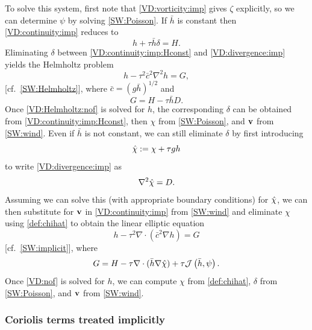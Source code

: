 \documentclass[12pt]{article}
\newcommand{\href}{\bar{h}}
\newcommand{\cbar}{\bar{c}}
\newcommand{\del}{\nabla}
\newcommand{\laplacian}[1]{\del^2#1}
\newcommand{\jacobian}[2]{\mathcal{J}\left(#1,#2\right)}
\begin{document}
To solve this system, first note that \eqref{VD:vorticity:imp} gives $\zeta$
explicitly, so we can determine $\psi$ by solving \eqref{SW:Poisson}. 
If $\href$ is constant then \eqref{VD:continuity:imp} reduces to
\begin{equation}
  h + \tau \href\delta = H .
\label{VD:continuity:imp:Hconst}
\end{equation}
Eliminating $\delta$ between \eqref{VD:continuity:imp:Hconst} and
\eqref{VD:divergence:imp} yields the Helmholtz problem
\begin{equation}
   h - \tau^2\cbar^2\del^2 h = G ,
\label{VD:Helmholtz:nof}
\end{equation}
[cf.~\eqref{SW:Helmholtz}], where $\cbar = \left(g\href\right)^{1/2}$ and 
\begin{equation}
   G = H - \tau \href D .
\end{equation}
Once \eqref{VD:Helmholtz:nof} is solved for $h$, the corresponding $\delta$
can be obtained from \eqref{VD:continuity:imp:Hconst}, then $\chi$ from
\eqref{SW:Poisson}, and $\mathbf{v}$ from \eqref{SW:wind}.  Even if $\href$ is not
constant, we can still eliminate $\delta$ by first introducing 
\begin{equation}
   \hat\chi := \chi + \tau gh
\label{def:chihat}
\end{equation}
to write \eqref{VD:divergence:imp} as
\begin{equation}
   \laplacian\chihat = D .
\label{eq:chihat}
\end{equation}
Assuming we can solve this (with appropriate boundary conditions) for
$\hat\chi$, we can then substitute for $\mathbf{v}$ in \eqref{VD:continuity:imp}
from \eqref{SW:wind} and eliminate $\chi$ using \eqref{def:chihat} to obtain
the linear elliptic equation
\begin{equation}
   h - \tau^2\del\cdot\left(\cbar^2\del h\right) = G 
\label{VD:nof}
\end{equation}
[cf.~\eqref{SW:implicit}], where
\begin{equation}
   G = H - \tau\del\cdot(\href\del\chihat) + \tau\jacobian{\href}{\psi} .
\end{equation}
Once \eqref{VD:nof} is solved for $h$, we can compute $\chi$ from
\eqref{def:chihat}, $\delta$ from \eqref{SW:Poisson}, and $\mathbf{v}$ from
\eqref{SW:wind}.

\pagebreak[2]
\subsubsection{Coriolis terms treated implicitly}
\end{document}
